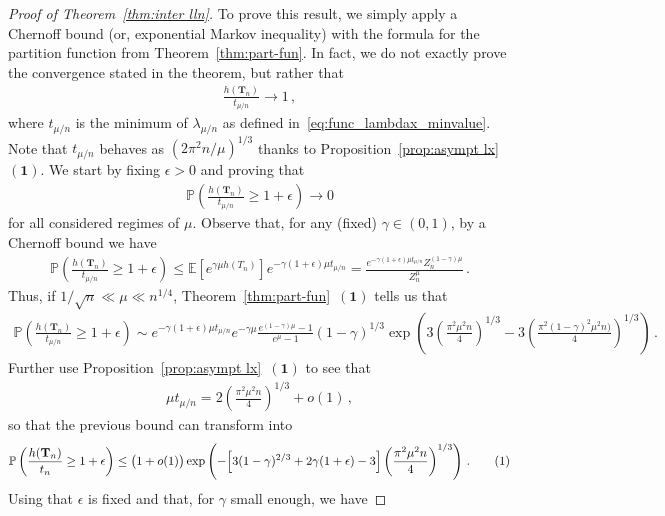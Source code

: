 \documentclass{article}
\newcommand{\pr}{\mathbb{P}}								%
\newcommand{\Prob}[1]{\pr\left(#1\right)}					%
\newcommand{\E}{\mathbb{E}}								%
\newcommand{\1}{\mathbbm{1}}								%
\newcommand\numberthis{\addtocounter{equation}{1}\tag{\theequation}}
\theoremstyle{definition}
\numberwithin{equation}{section}
\newcommand{\bT}{\mathbf T}
\newcommand{\numitem}[1]{$\mathbf{(#1)}$}
\begin{document}
\begin{proof}[Proof of Theorem~\ref{thm:inter lln}]
    To prove this result, we simply apply a Chernoff bound (or, exponential Markov inequality) with the formula for the partition function from Theorem~\ref{thm:part-fun}.
    In fact, we do not exactly prove the convergence stated in the theorem, but rather that
    \begin{align*}
        \frac{h(\bT_n)}{t_{\mu/n}}\longrightarrow1\,,
    \end{align*}
    where $t_{\mu/n}$ is the minimum of $\lambda_{\mu/n}$ as defined in~\eqref{eq:func_lambdax_minvalue}.
    Note that $t_{\mu/n}$ behaves as $(2\pi^2n/\mu)^{1/3}$ thanks to Proposition~\ref{prop:asympt lx}~\numitem{1}.
    We start by fixing $\epsilon>0$ and proving that
    \begin{align*}
        \Prob{\frac{h(\bT_n)}{t_{\mu/n}}\geq1+\epsilon}\longrightarrow0
    \end{align*}
    for all considered regimes of $\mu$.
    Observe that, for any (fixed) $\gamma\in(0,1)$, by a Chernoff bound we have
    \begin{align*}
        \Prob{\frac{h(\bT_n)}{t_{\mu/n}}\geq1+\epsilon}\leq\E\left[e^{\gamma\mu h(T_n)}\right]e^{-\gamma(1+\epsilon)\mu t_{\mu/n}}=\frac{e^{-\gamma(1+\epsilon)\mu t_{\mu/n}}Z_n^{(1-\gamma)\mu}}{Z_n^\mu}\,.
    \end{align*}
    Thus, if $1/\sqrt{n}\ll\mu\ll n^{1/4}$, Theorem~\ref{thm:part-fun}~\numitem{1} tells us that
    \begin{align*}
        \Prob{\frac{h(\bT_n)}{t_{\mu/n}}\geq1+\epsilon}\sim e^{-\gamma(1+\epsilon)\mu t_{\mu/n}}e^{-\gamma\mu}\frac{e^{(1-\gamma)\mu}-1}{e^\mu-1}\left(1-\gamma\right)^{1/3}\exp\left(3\left(\frac{\pi^2\mu^2n}{4}\right)^{1/3}-3\left(\frac{\pi^2(1-\gamma)^2\mu^2n)}{4}\right)^{1/3}\right)\,.
    \end{align*}
    Further use Proposition~\ref{prop:asympt lx}~\numitem{1} to see that
    \begin{align*}
        \mu t_{\mu/n}=2\left(\frac{\pi^2\mu^2n}{4}\right)^{1/3}+o(1)\,,
    \end{align*}
    so that the previous bound can transform into
    \begin{align*}
        \Prob{\frac{h(\bT_n)}{t_n}\geq1+\epsilon}\leq\big(1+o(1)\big)\exp\left(-\Big[3(1-\gamma)^{2/3}+2\gamma(1+\epsilon)-3\Big]\left(\frac{\pi^2\mu^2n}{4}\right)^{1/3}\right)\,.\numberthis \label{eq:LLN_UB}
    \end{align*}
    Using that $\epsilon$ is fixed and that, for $\gamma$ small enough, we have

\end{proof}
\end{document}
